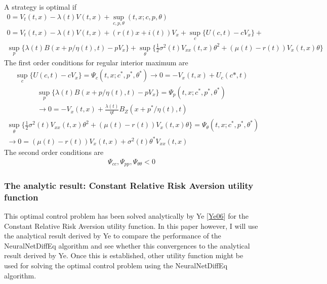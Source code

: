 \documentclass[letterpaper,10pt,english]{jupyterBook}
\begin{document}
\sphinxAtStartPar
A strategy is optimal if
\begin{gather*}
0 =V_t(t,x) -\lambda(t)V(t,x) + \sup_{c,p,\theta}(t,x;c,p,\theta)  \\
0 = V_t(t,x) -\lambda(t)V(t,x) + (r(t)x+ i(t))V_x + \sup_c\{U(c,t)-cV_x\} + \\ \sup_p\{\lambda(t)B(x + p/\eta(t),t) - pV_x\} + \sup_\theta \{ \frac{1}{2}\sigma^2(t)V_{xx}(t,x)\theta^2 +(\mu(t) - r(t))V_x(t,x)\theta\} 
\end{gather*}
\sphinxAtStartPar
The first order conditions for regular interior maximum are
\begin{equation*}
\begin{split}\sup_c  \{ U(c,t) - cV_x\} = \Psi_c(t,x;c^*,p^*,\theta^*)  \rightarrow  0 = -V_x(t,x) + U_c(c*,t) \end{split}
\end{equation*}\begin{equation*}
\begin{split} \sup_p\{\lambda(t)B(x + p/\eta(t),t) - pV_x\} = \Psi_p(t,x;c^*,p^*,\theta^*) \\ \rightarrow 0 = -V_x(t,x) + \frac{\lambda(t)}{\eta{t}}B_Z(x + p^*/\eta(t),t) \end{split}
\end{equation*}\begin{equation*}
\begin{split} \sup_\theta \{ \frac{1}{2}\sigma^2(t)V_{xx}(t,x)\theta^2 +(\mu(t) - r(t))V_x(t,x)\theta\} = \Psi_\theta(t,x;c^*,p^*,\theta^*)\\ \rightarrow 0 = (\mu(t) -r(t))V_x(t,x) + \sigma^2(t)\theta^*V_{xx}(t,x) \end{split}
\end{equation*}
\sphinxAtStartPar
The second order conditions are
\begin{equation*}
\begin{split} \Psi_{cc}, \Psi_{pp}, \Psi_{\theta \theta} < 0 \end{split}
\end{equation*}

\subsubsection{The analytic result: Constant Relative Risk Aversion utility function}
\label{\detokenize{Financial_application:the-analytic-result-constant-relative-risk-aversion-utility-function}}
\sphinxAtStartPar
This optimal control problem has been solved analytically by Ye {[}\hyperlink{cite.Financial_application:id25}{Ye06}{]} for the Constant Relative Risk Aversion utility function. In this paper however, I will use the analytical result derived by Ye to compare the performance of the NeuralNetDiffEq algorithm and see whether this convergences to the analytical result derived by Ye. Once this is established, other utility function might be used for solving the optimal control problem using the NeuralNetDiffEq algorithm.
\end{document}
